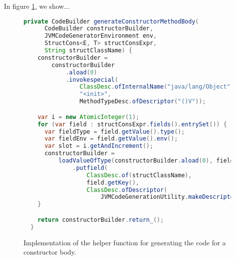 In figure \ref{fig:jvm_constructor_builder}, we show...

\begin{figure}
    \centering
    \begin{lstlisting}[language=Java]
  private CodeBuilder generateConstructorMethodBody(
      CodeBuilder constructorBuilder,
      JVMCodeGeneratorEnvironment env,
      StructCons<E, T> structConsExpr,
      String structClassName) {
    constructorBuilder =
        constructorBuilder
            .aload(0)
            .invokespecial(
                ClassDesc.ofInternalName("java/lang/Object"),
                "<init>",
                MethodTypeDesc.ofDescriptor("()V"));

    var i = new AtomicInteger(1);
    for (var field : structConsExpr.fields().entrySet()) {
      var fieldType = field.getValue().type();
      var fieldEnv = field.getValue().env();
      var slot = i.getAndIncrement();
      constructorBuilder =
          loadValueOfType(constructorBuilder.aload(0), fieldEnv, fieldType, slot)
              .putfield(
                  ClassDesc.of(structClassName),
                  field.getKey(),
                  ClassDesc.ofDescriptor(
                      JVMCodeGenerationUtility.makeDescriptor(field.getValue().type(), env)));
    }

    return constructorBuilder.return_();
  }
    \end{lstlisting}
    \caption{Implementation of the helper function for generating the code for a constructor body.}
    \label{fig:jvm_constructor_builder}
\end{figure}